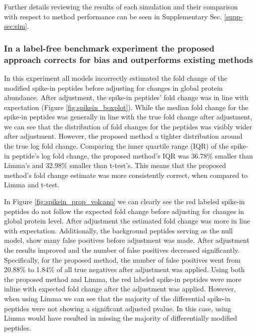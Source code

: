 \documentclass[mcp]{article}
\numberwithin{table}{section}
\begin{document}
Further details reviewing the results of each simulation and their comparison with respect to method performance can be seen in Supplementary Sec. \ref{supp-sec:sim}. 


\subsubsection*{In a label-free benchmark experiment the proposed approach corrects for bias and outperforms existing methods}

In this experiment all models incorrectly estimated the fold change of the modified spike-in peptides before adjusting for changes in global protein abundance. After adjustment, the spike-in peptides' fold change was in line with expectation (Figure \ref{fig:spikein_boxplot}). While the median fold change for the spike-in peptides was generally in line with the true fold change after adjustment, we can see that the distribution of fold changes for the peptides was visibly wider after adjustment. However, the proposed method a tighter distribution around the true log fold change. Comparing the inner quartile range (IQR) of the spike-in peptide's log fold change, the proposed method's IQR was 36.78\% smaller than Limma's and 32.98\% smaller than t-test's. This means that the proposed method's fold change estimate was more consistently correct, when compared to Limma and t-test.

In Figure \ref{fig:spikein_prop_volcano} we can clearly see the red labeled spike-in peptides do not follow the expected fold change before adjusting for changes in global protein level. After adjustment the estimated fold change was more in line with expectation. Additionally, the background peptides serving as the null model, show many false positives before adjustment was made. After adjustment the results improved and the number of false positives decreased significantly. Specifically, for the proposed method, the number of false positives went from 20.88\% to 1.84\% of all true negatives after adjustment was applied. Using both the proposed method and Limma, the red labeled spike-in peptides were more inline with expected fold change after the adjustment was applied. However, when using Limma we can see that the majority of the differential spike-in peptides were not showing a significant adjusted pvalue. In this case, using Limma would have resulted in missing the majority of differentially modified peptides.
\end{document}
